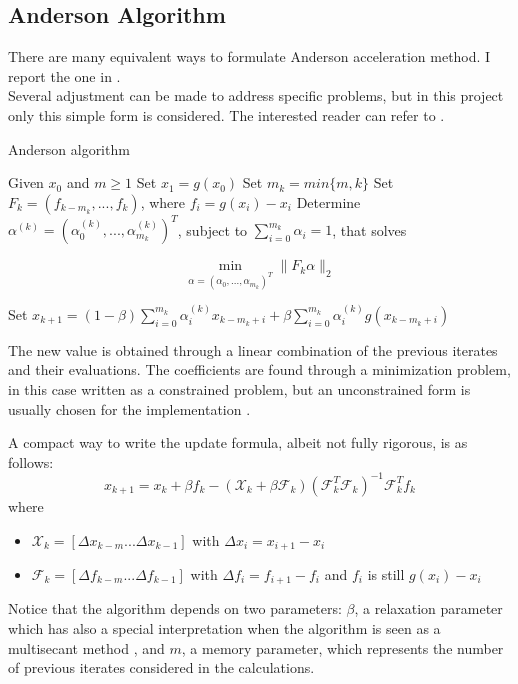 \documentclass[12pt]{article}
\begin{document}
			\subsection{Anderson Algorithm}
				There are many equivalent ways to formulate Anderson acceleration method.
				I report the one in \citeauthor{Walker} \cite{Walker}.\\
				Several adjustment can be made to address specific problems, but in this
				project only this simple form is considered. The interested reader can
				refer to \cite{Fang} \cite{Walker}.
				
			\begin{algorithm}
				\caption{Anderson algorithm}
				\label{alg1}
			\begin{algorithmic}
				\State Given $x_0$ and $m \geq 1$
				\State Set $x_1 = g(x_0)$
				\State Set $m_k = min\{m, k\}$
				\State Set $F_k = (f_{k-m_k}, ... , f_k)$, where $f_i = g(x_i)-x_{i}$
				\State Determine $\alpha^{(k)} = (\alpha^{(k)}_0 , ..., \alpha^{(k)}_{m_k} )^T$, subject to 
				$\sum^{m_k}_{i=0} {\alpha_i = 1}$, that solves
				
				\begin{equation}
				\min_{\alpha=(\alpha_0,...,\alpha_{m_k} )^T} \|F_k \alpha\|_2
				\end{equation}
				
				\State Set $x_{k+1} = (1-\beta) \sum^{m_k}_{i=0} {\alpha_i^{(k)} x_{k-m_{k}+i}}	+\beta \sum^{m_k}_{i=0} {\alpha_i^{(k)} g(x_{k-m_{k}+i})}$   
				\EndFor
				\end{algorithmic}	
				\end{algorithm}
				
			The new value is obtained through a linear combination of the previous iterates and their evaluations.
			The coefficients are found through a minimization problem, in this case written as a constrained
			problem, but an unconstrained form is usually chosen for the implementation \cite{Fang}\cite{Walker}.
			
			A compact way to write the update formula, albeit not fully rigorous, is as follows:
			\begin{equation}
				\label{eq:2}
				x_{k+1}=x_{k} + \beta f_k -(\mathscr{X}_k + \beta \mathscr{F}_k)(\mathscr{F}_k^T \mathscr{F}_k)^{-1}\mathscr{F}_k^T f_k
			\end{equation}
			where \begin{itemize}
			\item	$\mathscr{X}_k=[\Delta x_{k-m}...\Delta x_{k-1}]$ with $\Delta x_{i}=x_{i+1}-x_i$  
			\item $\mathscr{F}_k=[\Delta f_{k-m}...\Delta f_{k-1}]$ with $\Delta f_{i}=f_{i+1}-f_i$ and $f_i$ is still $g(x_i)-x_{i}$
			\end{itemize}
			Notice that the algorithm depends on two parameters: $\beta$, a relaxation parameter which has also
			a special interpretation when the algorithm is seen as a multisecant method \cite{Fang}, and $m$,
			a memory parameter, which represents the number of previous iterates considered in the calculations.
			
\end{document}
